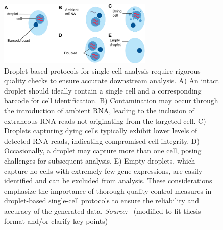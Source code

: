 \begin{figure}[!ht]
	\centering
	\includegraphics[width=0.65\textwidth]{QC_cells/fig}
	\vspace{0.1cm}
	\caption[Droplets-based sequencing of dying cells, doublet and empty droplet .]{Droplet-based protocols for single-cell analysis require rigorous quality checks to ensure accurate downstream analysis. A) An intact droplet should ideally contain a single cell and a corresponding barcode for cell identification. B) Contamination may occur through the introduction of ambient RNA, leading to the inclusion of extraneous RNA reads not originating from the targeted cell. C) Droplets capturing dying cells typically exhibit lower levels of detected RNA reads, indicating compromised cell integrity. D) Occasionally, a droplet may capture more than one cell, posing challenges for subsequent analysis. E) Empty droplets, which capture no cells with extremely few gene expressions, are easily identified and can be excluded from analysis. These considerations emphasize the importance of thorough quality control measures in droplet-based single-cell protocols to ensure the reliability and accuracy of the generated data. \emph{Source:~\cite{heumos2023best}} (modified to fit thesis format and/or clarify key points)}
	\label{fig:QCcells}
\end{figure}
